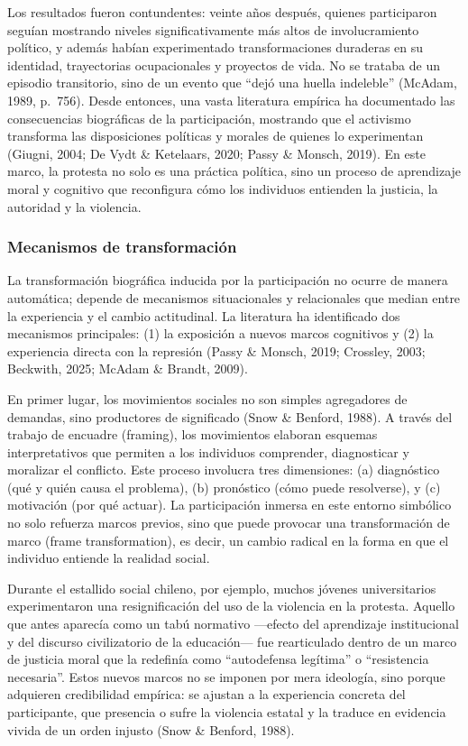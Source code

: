\documentclass[
  13pt,
]{article}
\begin{document}
Los resultados fueron contundentes: veinte años después, quienes
participaron seguían mostrando niveles significativamente más altos de
involucramiento político, y además habían experimentado transformaciones
duraderas en su identidad, trayectorias ocupacionales y proyectos de
vida. No se trataba de un episodio transitorio, sino de un evento que
``dejó una huella indeleble'' (McAdam, 1989, p.~756). Desde entonces,
una vasta literatura empírica ha documentado las consecuencias
biográficas de la participación, mostrando que el activismo transforma
las disposiciones políticas y morales de quienes lo experimentan
(Giugni, 2004; De Vydt \& Ketelaars, 2020; Passy \& Monsch, 2019). En
este marco, la protesta no solo es una práctica política, sino un
proceso de aprendizaje moral y cognitivo que reconfigura cómo los
individuos entienden la justicia, la autoridad y la violencia.

\subsubsection{Mecanismos de
transformación}\label{mecanismos-de-transformaciuxf3n}

La transformación biográfica inducida por la participación no ocurre de
manera automática; depende de mecanismos situacionales y relacionales
que median entre la experiencia y el cambio actitudinal. La literatura
ha identificado dos mecanismos principales: (1) la exposición a nuevos
marcos cognitivos y (2) la experiencia directa con la represión (Passy
\& Monsch, 2019; Crossley, 2003; Beckwith, 2025; McAdam \& Brandt,
2009).

En primer lugar, los movimientos sociales no son simples agregadores de
demandas, sino productores de significado (Snow \& Benford, 1988). A
través del trabajo de encuadre (framing), los movimientos elaboran
esquemas interpretativos que permiten a los individuos comprender,
diagnosticar y moralizar el conflicto. Este proceso involucra tres
dimensiones: (a) diagnóstico (qué y quién causa el problema), (b)
pronóstico (cómo puede resolverse), y (c) motivación (por qué actuar).
La participación inmersa en este entorno simbólico no solo refuerza
marcos previos, sino que puede provocar una transformación de marco
(frame transformation), es decir, un cambio radical en la forma en que
el individuo entiende la realidad social.

Durante el estallido social chileno, por ejemplo, muchos jóvenes
universitarios experimentaron una resignificación del uso de la
violencia en la protesta. Aquello que antes aparecía como un tabú
normativo ---efecto del aprendizaje institucional y del discurso
civilizatorio de la educación--- fue rearticulado dentro de un marco de
justicia moral que la redefinía como ``autodefensa legítima'' o
``resistencia necesaria''. Estos nuevos marcos no se imponen por mera
ideología, sino porque adquieren credibilidad empírica: se ajustan a la
experiencia concreta del participante, que presencia o sufre la
violencia estatal y la traduce en evidencia vivida de un orden injusto
(Snow \& Benford, 1988).
\end{document}
